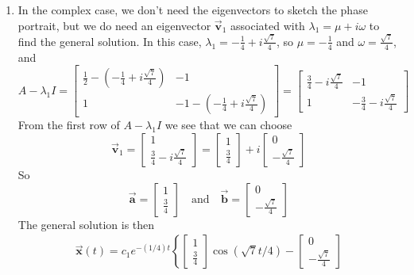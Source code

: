 \documentclass[reqno]{immbook}
\newcommand{\BA}{\vec{\textbf{a}}}
\newcommand{\BB}{\vec{\textbf{b}}}
\newcommand{\BV}{\vec{\textbf{v}}}
\newcommand{\BX}{\vec{\textbf{x}}}
\begin{document}
\begin{enumerate}
\item In the complex case, we don't need the eigenvectors
to sketch the phase portrait, but we do need an eigenvector
$\BV_1$ associated with $\lambda_1 = \mu + i \omega$
to find the general solution.
In this case, $\lambda_1 = -\frac{1}{4}+i\frac{\sqrt{7}}{4}$,
so $\mu = -\frac{1}{4}$ and $\omega = \frac{\sqrt{7}}{4}$,
and
\begin{equation}
A-\lambda_1 I =
  \begin{bmatrix}
     \frac{1}{2} - \left( -\frac{1}{4}+i\frac{\sqrt{7}}{4} \right) & -1 \\
     1 & -1 -\left( -\frac{1}{4}+i\frac{\sqrt{7}}{4} \right)
  \end{bmatrix}
     = 
  \begin{bmatrix}
          \frac{3}{4}-i\frac{\sqrt{7}}{4} & -1 \\
	  1 & -\frac{3}{4}-i\frac{\sqrt{7}}{4}
  \end{bmatrix}
\end{equation}
From the first row of $A-\lambda_1 I$ we see that we can choose
\begin{equation}
  \BV_1 = \begin{bmatrix} 1 \\ \frac{3}{4}-i\frac{\sqrt{7}}{4} \end{bmatrix}
   = \begin{bmatrix} 1 \\ \frac{3}{4} \end{bmatrix}
      + i \begin{bmatrix} 0 \\ -\frac{\sqrt{7}}{4} \end{bmatrix}
\end{equation}
So
\begin{equation}
  \BA = \begin{bmatrix} 1 \\ \frac{3}{4} \end{bmatrix}
  \quad \textrm{and} \quad
  \BB = \begin{bmatrix} 0 \\ -\frac{\sqrt{7}}{4} \end{bmatrix}
\end{equation}
The general solution is then
\begin{multline}
  \BX(t) = c_1 e^{-(1/4)t}
      \left\{\begin{bmatrix} 1 \\ \frac{3}{4} \end{bmatrix} \cos\left( \sqrt{7}t/4\right)
      - \begin{bmatrix} 0 \\ -\frac{\sqrt{7}}{4} \end{bmatrix}

\end{multline}
\end{enumerate}
\end{document}
